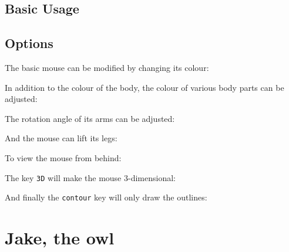 \documentclass[parskip=half]{scrartcl}
\begin{document}
\subsection{Basic Usage}

\begin{tcblisting}{}
\mouse
\end{tcblisting}

\subsection{Options}

The basic mouse can be modified by changing its colour:
\begin{tcblisting}{}
\mouse[body=blue]
\end{tcblisting}

In addition to the colour of the body, the colour of various body parts can be adjusted:
\begin{tcblisting}{}
\mouse[eye=red]
\end{tcblisting}
\begin{tcblisting}{}
\mouse[whiskers=red]
\end{tcblisting}

The rotation angle of its arms can be adjusted:
\begin{tcblisting}{}
\mouse[rotatearms=40]
\end{tcblisting}

And the mouse can lift its legs:
\begin{tcblisting}{}
\mouse[leftstep]
\mouse[rightstep,xshift=2cm]
\end{tcblisting}

To view the mouse from behind:
\begin{tcblisting}{}
\mouse[back]
\end{tcblisting}

The key \lstinline|3D| will make the mouse 3-dimensional:
\begin{tcblisting}{}
\mouse[3D]
\end{tcblisting}

And finally the \lstinline|contour| key will only draw the outlines:
\begin{tcblisting}{}
\mouse[contour=black]
\end{tcblisting}

%
%
\clearpage
\section[Owl]{Jake, the owl}
\end{document}

